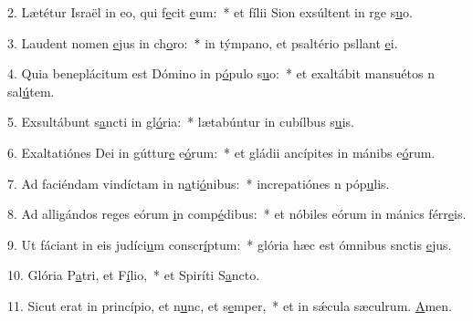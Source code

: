 2. Lætétur Israël in eo, qui f\uline{e}cit \uline{e}um:~* et fílii Sion exsúltent in rge s\uline{u}o.\par 
3. Laudent nomen \uline{e}jus in ch\uline{o}ro:~* in týmpano, et psaltério psllant \uline{e}i.\par 
4. Quia beneplácitum est Dómino in p\uline{ó}pulo s\uline{u}o:~* et exaltábit mansuétos n sal\uline{ú}tem.\par 
5. Exsultábunt s\uline{a}ncti in gl\uline{ó}ria:~* lætabúntur in cubílbus s\uline{u}is.\par 
6. Exaltatiónes Dei in gúttur\uline{e} e\uline{ó}rum:~* et gládii ancípites in mánibs e\uline{ó}rum.\par 
7. Ad faciéndam vindíctam in n\uline{a}ti\uline{ó}nibus:~* increpatiónes n póp\uline{u}lis.\par 
8. Ad alligándos reges eórum \uline{i}n comp\uline{é}dibus:~* et nóbiles eórum in mánics férr\uline{e}is.\par 
9. Ut fáciant in eis judíci\uline{u}m conscr\uline{í}ptum:~* glória hæc est ómnibus snctis \uline{e}jus.\par 
10. Glória P\uline{a}tri, et F\uline{í}lio,~* et Spiríti S\uline{a}ncto.\par 
11. Sicut erat in princípio, et n\uline{u}nc, et s\uline{e}mper,~* et in sǽcula sæculrum. \uline{A}men.\par 
